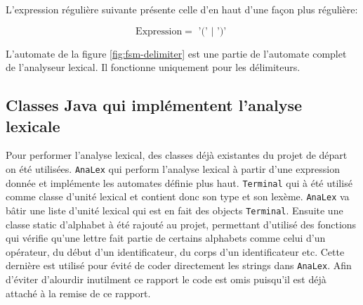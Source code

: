 L'expression régulière suivante présente celle d'en haut d'une façon plus régulière:

\begin{equation}
  \textrm{Expression} = \textrm{ '(' } | \textrm{ ')' }
\end{equation}

L'automate de la figure \ref{fig:fsm-delimiter} est une partie de l'automate
complet de l'analyseur lexical. Il fonctionne uniquement pour les délimiteurs.

\subsection{Classes Java qui implémentent l’analyse lexicale}

Pour performer l'analyse lexical, des classes déjà existantes du projet de
départ on été utilisées. \verb|AnaLex| qui perform l'analyse lexical
à partir d'une expression donnée et implémente les automates définie plus
haut. \verb|Terminal| qui à été utilisé comme classe d'unité lexical et
contient donc son type et son lexème. \verb|AnaLex| va bâtir une liste
d'unité lexical qui est en fait des objects \verb|Terminal|. Ensuite une
classe static d'alphabet à été rajouté au projet, permettant d'utilisé des
fonctions qui vérifie qu'une lettre fait partie de certains alphabets comme
celui d'un opérateur, du début d'un identificateur, du corps d'un
identificateur etc. Cette dernière est utilisé pour évité de coder
directement les strings dans \verb|AnaLex|. Afin d'éviter d'alourdir
inutilment ce rapport le code est omis puisqu'il est déjà attaché à la remise
de ce rapport.
